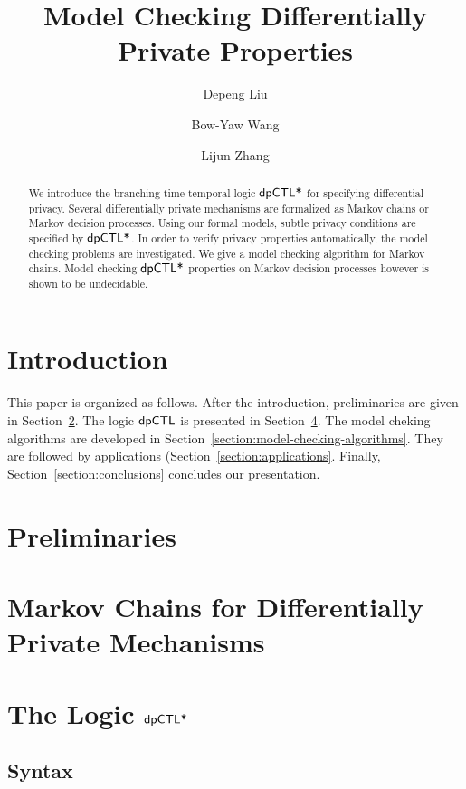 \documentclass{llncs}
\title{Model Checking Differentially Private Properties}
\author{
Depeng Liu\inst{1}
\and
Bow-Yaw Wang\inst{2}
\and
Lijun Zhang\inst{1}}
\institute{
Chinese Academy of Sciences
\and
Academia Sinica
}
\author{\vspace*{-1.2cm}}
\institute{\vspace*{-1.2cm}\ }
\begin{document}
\maketitle

\begin{abstract}
  We introduce the branching time temporal logic $\textsf{dpCTL*}$ for
  specifying differential privacy. Several differentially private
  mechanisms are formalized as Markov chains or Markov decision
  processes. Using our formal models, subtle privacy conditions
  are specified by $\textsf{dpCTL*}$. In order to verify privacy properties
  automatically, the model checking problems are investigated.  We
  give a model checking algorithm for Markov chains. Model checking
  $\textsf{dpCTL*}$ properties on Markov decision processes however is
  shown to be undecidable.
\end{abstract}

\section{Introduction}
\label{section:introduction}


This paper is organized as follows. After the introduction,
preliminaries are given in Section~\ref{section:preliminaries}. The
logic $\textsf{dpCTL}$ is presented in
Section~\ref{section:dpCTL}. The model cheking algorithms are developed in
Section~\ref{section:model-checking-algorithms}. They are followed by
applications (Section~\ref{section:applications}. Finally,
Section~\ref{section:conclusions} concludes our presentation.

\section{Preliminaries}
\label{section:preliminaries}


\section{Markov Chains  for Differentially Private Mechanisms}
\label{section:examples}


\section{The Logic $\textsf{dpCTL*}$}
\label{section:dpCTL}


\subsection{Syntax}
\label{subsection:syntax}

\end{document}
